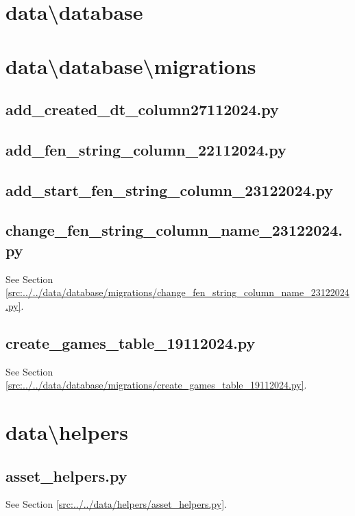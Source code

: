 \documentclass[../main/main.tex]{subfiles}
\begin{document}
\section{data\textbackslash database}
\section{data\textbackslash database\textbackslash migrations}
\subsection{add\_created\_dt\_column27112024.py}

\label{src:data/database/migrations/add_created_dt_column27112024.py}

\subsection{add\_fen\_string\_column\_22112024.py}

\label{src:data/database/migrations/add_fen_string_column_22112024.py}

\subsection{add\_start\_fen\_string\_column\_23122024.py}

\label{src:data/database/migrations/add_start_fen_string_column_23122024.py}

\subsection{change\_fen\_string\_column\_name\_23122024.py}
See Section \ref{src:../../data/database/migrations/change_fen_string_column_name_23122024.py}.

\subsection{create\_games\_table\_19112024.py}
See Section \ref{src:../../data/database/migrations/create_games_table_19112024.py}.

\section{data\textbackslash helpers}
\subsection{asset\_helpers.py}
See Section \ref{src:../../data/helpers/asset_helpers.py}.
\end{document}
